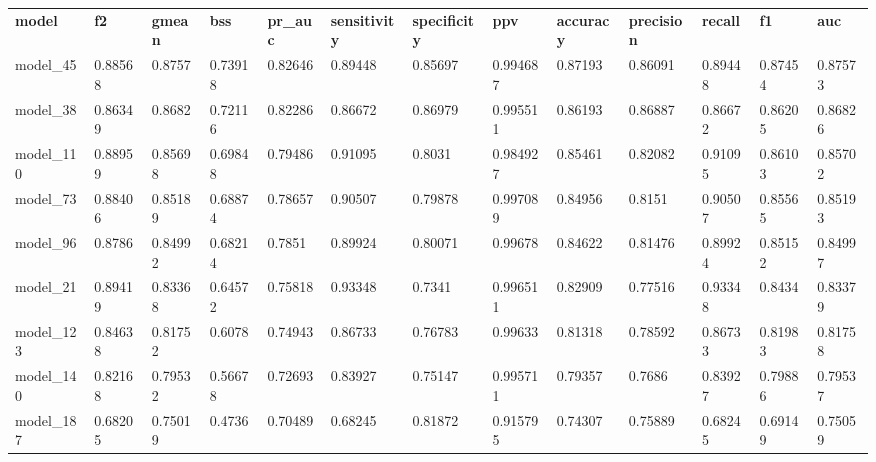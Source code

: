 \begin{tabular}{lllllllllllll}
\textbf{model} & \textbf{f2} & \textbf{gmean} & \textbf{bss} & \textbf{pr\_auc} & \textbf{sensitivity} & \textbf{specificity} & \textbf{ppv} & \textbf{accuracy} & \textbf{precision} & \textbf{recall} & \textbf{f1} & \textbf{auc} \\
model\_45      & 0.88568     & 0.8757         & 0.73918      & 0.82646          & 0.89448              & 0.85697              & 0.994687     & 0.87193           & 0.86091            & 0.89448         & 0.87454     & 0.87573      \\
model\_38      & 0.86349     & 0.8682         & 0.72116      & 0.82286          & 0.86672              & 0.86979              & 0.995511     & 0.86193           & 0.86887            & 0.86672         & 0.86205     & 0.86826      \\
model\_110     & 0.88959     & 0.85698        & 0.69848      & 0.79486          & 0.91095              & 0.8031               & 0.984927     & 0.85461           & 0.82082            & 0.91095         & 0.86103     & 0.85702      \\
model\_73      & 0.88406     & 0.85189        & 0.68874      & 0.78657          & 0.90507              & 0.79878              & 0.997089     & 0.84956           & 0.8151             & 0.90507         & 0.85565     & 0.85193      \\
model\_96      & 0.8786      & 0.84992        & 0.68214      & 0.7851           & 0.89924              & 0.80071              & 0.99678      & 0.84622           & 0.81476            & 0.89924         & 0.85152     & 0.84997      \\
model\_21      & 0.89419     & 0.83368        & 0.64572      & 0.75818          & 0.93348              & 0.7341               & 0.996511     & 0.82909           & 0.77516            & 0.93348         & 0.8434      & 0.83379      \\
model\_123     & 0.84638     & 0.81752        & 0.6078       & 0.74943          & 0.86733              & 0.76783              & 0.99633      & 0.81318           & 0.78592            & 0.86733         & 0.81983     & 0.81758      \\
model\_140     & 0.82168     & 0.79532        & 0.56678      & 0.72693          & 0.83927              & 0.75147              & 0.995711     & 0.79357           & 0.7686             & 0.83927         & 0.79886     & 0.79537      \\
model\_187     & 0.68205     & 0.75019        & 0.4736       & 0.70489          & 0.68245              & 0.81872              & 0.915795     & 0.74307           & 0.75889            & 0.68245         & 0.69149     & 0.75059      \\

\end{tabular}
